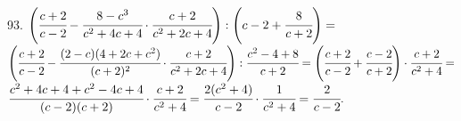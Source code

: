 93. $\left(\cfrac{c+2}{c-2}-\cfrac{8-c^3}{c^2+4c+4}\cdot\cfrac{c+2}{c^2+2c+4}\right):\left(c-2+\cfrac{8}{c+2}\right)=$\\$
\left(\cfrac{c+2}{c-2}-\cfrac{(2-c)(4+2c+c^2)}{(c+2)^2}\cdot\cfrac{c+2}{c^2+2c+4}\right):\cfrac{c^2-4+8}{c+2}=
\left(\cfrac{c+2}{c-2}+\cfrac{c-2}{c+2}\right)\cdot\cfrac{c+2}{c^2+4}=$\\$
\cfrac{c^2+4c+4+c^2-4c+4}{(c-2)(c+2)}\cdot\cfrac{c+2}{c^2+4}=
\cfrac{2(c^2+4)}{c-2}\cdot\cfrac{1}{c^2+4}=\cfrac{2}{c-2}.$\\
